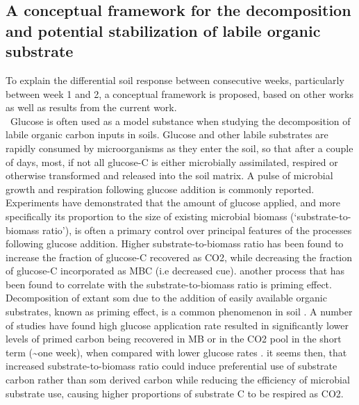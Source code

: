 	\subsection{A conceptual framework for the decomposition and potential stabilization of labile organic substrate}
	To explain the differential soil response between consecutive weeks, particularly between week 1 and 2, a conceptual framework is proposed, based on other works as well as results from the current work.\\ \
		Glucose is often used as a model substance when studying the decomposition of labile organic carbon inputs in soils\citep{kuzyakov2010}. Glucose and other labile substrates are rapidly consumed by microorganisms as they enter the soil, so that after a couple of days, most, if not all glucose-C is either microbially assimilated, respired or otherwise transformed and released into the soil matrix\citep{fischer2010}. A pulse of microbial growth and respiration following glucose addition is commonly reported.
	Experiments have demonstrated that the amount of glucose applied, and more specifically its proportion to the size of existing microbial biomass (‘substrate-to-biomass ratio’), is often a primary control over principal features of the processes following  glucose addition. Higher substrate-to-biomass ratio has been found to increase the fraction of glucose-C recovered as CO2, while decreasing the fraction of glucose-C incorporated as MBC (i.e decreased \gls{cue})\citep{schneckenberger2008, tian2015}.
	another process that has been found to correlate with the substrate-to-biomass ratio is priming effect. Decomposition of extant \gls{som} due to the addition of easily available organic substrates, known as priming effect, is a common phenomenon in soil \citep{kuzyakov2010}. A number of studies have found  high glucose application rate resulted in significantly lower levels of primed carbon being recovered in MB or in the  CO2 pool in the short term (\~{}one week), when compared with lower glucose rates \citep{blagodatskaya2011, schneckenberger2008, wu1993}.
	it seems then, that increased substrate-to-biomass ratio could induce preferential use of substrate carbon rather than \gls{som} derived carbon while reducing the efficiency of microbial substrate use, causing higher proportions of substrate C to be respired as CO2.
